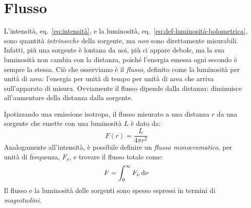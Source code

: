 \section{Flusso}\label{sec:flusso}
L'intensità, eq.~\eqref{eq:intensità}, e la luminosità, eq.~\eqref{eq:def-luminosità-bolometrica},  sono quantità \emph{intrinseche} della sorgente, ma \emph{non} sono direttamente misurabili. Infatti, più una sorgente è lontana da noi, più ci appare debole, ma la sua luminosità non cambia con la distanza, poiché l'energia emessa ogni secondo è sempre la stessa. Ciò che osserviamo è il \emph{flusso}, definito come la luminosità per unità di area: l'energia per unità di tempo per unità di area che arriva sull'apparato di misura. Ovviamente il flusso dipende dalla distanza: diminuisce all'aumentare della distanza dalla sorgente.

Ipotizzando una emissione isotropa, il flusso misurato a una distanza $r$ da una sorgente che emette con una luminosità $L$ è dato da:
\begin{equation}\label{eq:flusso}
    F(r) = \frac{L}{4 \pi r^2}
\end{equation}
Analogamente all'intensità, è possibile definire un \emph{flusso monocromatico}, per unità di frequenza, $F_\nu$, e trovare il flusso totale come:
\[
    F = \int_0^\infty F_\nu \mathop{\mathrm{{}d}}\mathopen{} \nu
\]
Il flusso e la luminosità delle sorgenti sono spesso espressi in termini di \emph{magnitudini}.
